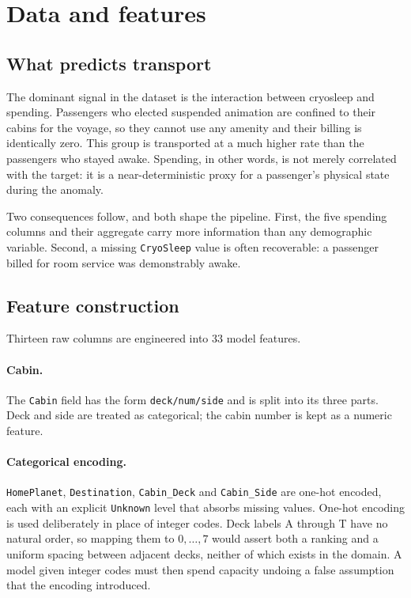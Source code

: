 \documentclass[11pt,a4paper]{article}
\begin{document}
\section{Data and features}
\label{sec:features}

\subsection{What predicts transport}

The dominant signal in the dataset is the interaction between cryosleep and
spending. Passengers who elected suspended animation are confined to their
cabins for the voyage, so they cannot use any amenity and their billing is
identically zero. This group is transported at a much higher rate than the
passengers who stayed awake. Spending, in other words, is not merely correlated
with the target: it is a near-deterministic proxy for a passenger's physical
state during the anomaly.

Two consequences follow, and both shape the pipeline. First, the five spending
columns and their aggregate carry more information than any demographic
variable. Second, a missing \texttt{CryoSleep} value is often recoverable: a
passenger billed for room service was demonstrably awake.

\subsection{Feature construction}

Thirteen raw columns are engineered into 33 model features.

\paragraph{Cabin.} The \texttt{Cabin} field has the form \texttt{deck/num/side}
and is split into its three parts. Deck and side are treated as categorical;
the cabin number is kept as a numeric feature.

\paragraph{Categorical encoding.} \texttt{HomePlanet}, \texttt{Destination},
\texttt{Cabin\_Deck} and \texttt{Cabin\_Side} are one-hot encoded, each with an
explicit \texttt{Unknown} level that absorbs missing values. One-hot encoding is
used deliberately in place of integer codes. Deck labels A through T have no
natural order, so mapping them to $0,\dots,7$ would assert both a ranking and a
uniform spacing between adjacent decks, neither of which exists in the domain. A
model given integer codes must then spend capacity undoing a false assumption
that the encoding introduced.
\end{document}
